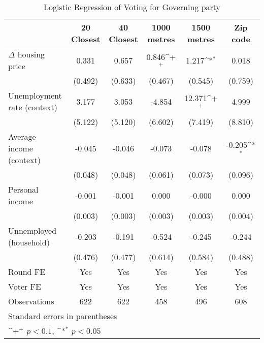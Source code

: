 \begin{table}[htbp]\centering
\def\sym#1{\ifmmode^{#1}\else\(^{#1}\)\fi}
\caption{Logistic Regression of Voting for Governing party } \footnotesize \label{logit}
\begin{tabular}{l*{5}{c}}
\hline\hline
                    &\multicolumn{1}{c}{20 Closest}&\multicolumn{1}{c}{40 Closest}&\multicolumn{1}{c}{1000 metres}&\multicolumn{1}{c}{1500 metres}&\multicolumn{1}{c}{Zip code}\\
\hline
$\Delta$ housing price&       0.331       &       0.657       &       0.846\sym{+}&       1.217\sym{*}&       0.018       \\
                    &     (0.492)       &     (0.633)       &     (0.467)       &     (0.545)       &     (0.759)       \\
[1em]
Unemployment rate (context)&       3.177       &       3.053       &      -4.854       &      12.371\sym{+}&       4.999       \\
                    &     (5.122)       &     (5.120)       &     (6.602)       &     (7.419)       &     (8.810)       \\
[1em]
Average income (context)&      -0.045       &      -0.046       &      -0.073       &      -0.078       &      -0.205\sym{*}\\
                    &     (0.048)       &     (0.048)       &     (0.061)       &     (0.073)       &     (0.096)       \\
[1em]
Personal income     &      -0.001       &      -0.001       &       0.000       &      -0.000       &       0.000       \\
                    &     (0.003)       &     (0.003)       &     (0.003)       &     (0.003)       &     (0.004)       \\
[1em]
Unnemployed (household)&      -0.203       &      -0.191       &      -0.524       &      -0.245       &      -0.244       \\
                    &     (0.476)       &     (0.477)       &     (0.614)       &     (0.584)       &     (0.488)       \\
[1em]
\hline  Round FE    &         Yes       &         Yes       &         Yes       &         Yes       &         Yes       \\
[1em]
Voter FE            &         Yes       &         Yes       &         Yes       &         Yes       &         Yes       \\
\hline
Observations        &         622       &         622       &         458       &         496       &         608       \\
\hline\hline
\multicolumn{6}{l}{\footnotesize Standard errors in parentheses}\\
\multicolumn{6}{l}{\footnotesize \sym{+} \(p<0.1\), \sym{*} \(p<0.05\)}\\
\end{tabular}
\end{table}
